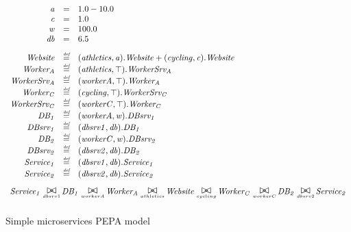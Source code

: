 \documentclass[runningheads]{llncs}
\begin{document}
\begin{figure}
	\centering
	\begin{displaymath}
	\begin{array}{rcl}
	\mathit{a} & = & 1.0 - 10.0\\
	\mathit{c} & = & 1.0\\
	\mathit{w} & = & 100.0\\
	\mathit{db} & = & 6.5\\
	[2.0ex]		\mathit{Website} & \rmdef & (\mathit{athletics},\mathit{a}).\mathit{Website}+(\mathit{cycling},\mathit{c}).\mathit{Website}\\
	\mathit{Worker_A} & \rmdef & (\mathit{athletics},\top).\mathit{WorkerSrv_A}\\
	\mathit{WorkerSrv_A} & \rmdef & (\mathit{workerA},\top).\mathit{Worker_A}\\
	\mathit{Worker_C} & \rmdef & (\mathit{cycling},\top).\mathit{WorkerSrv_C}\\
	\mathit{WorkerSrv_C} & \rmdef & (\mathit{workerC},\top).\mathit{Worker_C}\\
	\mathit{DB_1} & \rmdef & (\mathit{workerA},\mathit{w}).\mathit{DBsrv_1}\\
	\mathit{DBsrv_1} & \rmdef & (\mathit{dbsrv1},\mathit{db}).\mathit{DB_1}\\
	\mathit{DB_2} & \rmdef & (\mathit{workerC},\mathit{w}).\mathit{DBsrv_2}\\
	\mathit{DBsrv_2} & \rmdef & (\mathit{dbsrv2},\mathit{db}).\mathit{DB_2}\\
	\mathit{Service_1} & \rmdef & (\mathit{dbsrv1},\mathit{db}).\mathit{Service_1}\\
	\mathit{Service_2} & \rmdef & (\mathit{dbsrv2},\mathit{db}).\mathit{Service_2}\\
	[2.0ex]		\multicolumn{3}{l}{\mathit{Service_1}\sync{dbsrv1}\mathit{DB_1}\sync{workerA}\mathit{Worker_A}\sync{athletics}\mathit{Website}\sync{cycling}\mathit{Worker_C}\sync{workerC}\mathit{DB_2}\sync{dbsrv2}\mathit{Service_2}}\\
	[2.0ex]	\end{array}
	\end{displaymath}
	\caption{Simple microservices PEPA model}
	\label{figure:simplemicro}
\end{figure}
\end{document}
